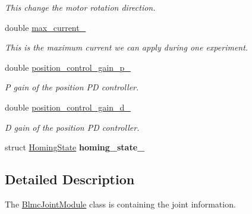 \begin{DoxyCompactItemize}
\begin{DoxyCompactList}\small\item\em This change the motor rotation direction. \end{DoxyCompactList}\item 
double \hyperlink{classblmc__robots_1_1BlmcJointModule_af10e1b734a9d4735301962fd9f9c413f}{max\+\_\+current\+\_\+}
\begin{DoxyCompactList}\small\item\em This is the maximum current we can apply during one experiment. \end{DoxyCompactList}\item 
double \hyperlink{classblmc__robots_1_1BlmcJointModule_afa5a06b057850fc626649fd13e3f376c}{position\+\_\+control\+\_\+gain\+\_\+p\+\_\+}\hypertarget{classblmc__robots_1_1BlmcJointModule_afa5a06b057850fc626649fd13e3f376c}{}\label{classblmc__robots_1_1BlmcJointModule_afa5a06b057850fc626649fd13e3f376c}

\begin{DoxyCompactList}\small\item\em P gain of the position PD controller. \end{DoxyCompactList}\item 
double \hyperlink{classblmc__robots_1_1BlmcJointModule_a1141b35d0c53d1f4cca107919c1c861e}{position\+\_\+control\+\_\+gain\+\_\+d\+\_\+}\hypertarget{classblmc__robots_1_1BlmcJointModule_a1141b35d0c53d1f4cca107919c1c861e}{}\label{classblmc__robots_1_1BlmcJointModule_a1141b35d0c53d1f4cca107919c1c861e}

\begin{DoxyCompactList}\small\item\em D gain of the position PD controller. \end{DoxyCompactList}\item 
struct \hyperlink{structblmc__robots_1_1HomingState}{Homing\+State} {\bfseries homing\+\_\+state\+\_\+}\hypertarget{classblmc__robots_1_1BlmcJointModule_ab7a861d47a808b14e43af7f58ca56284}{}\label{classblmc__robots_1_1BlmcJointModule_ab7a861d47a808b14e43af7f58ca56284}

\end{DoxyCompactItemize}


\subsection{Detailed Description}
The \hyperlink{classblmc__robots_1_1BlmcJointModule}{Blmc\+Joint\+Module} class is containing the joint information. 

